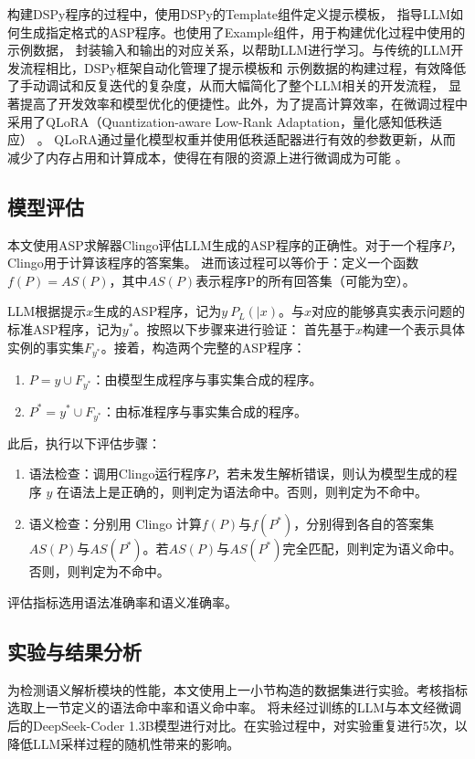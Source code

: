 构建DSPy程序的过程中，使用DSPy的Template组件定义提示模板，
指导LLM如何生成指定格式的ASP程序。也使用了Example组件，用于构建优化过程中使用的示例数据，
封装输入和输出的对应关系，以帮助LLM进行学习。与传统的LLM开发流程相比，DSPy框架自动化管理了提示模板和
示例数据的构建过程，有效降低了手动调试和反复迭代的复杂度，从而大幅简化了整个LLM相关的开发流程，
显著提高了开发效率和模型优化的便捷性。此外，为了提高计算效率，在微调过程中采用了QLoRA（Quantization-aware Low-Rank Adaptation，量化感知低秩适应） 。
QLoRA通过量化模型权重并使用低秩适配器进行有效的参数更新，从而减少了内存占用和计算成本，使得在有限的资源上进行微调成为可能 。
\subsection{模型评估}
本文使用ASP求解器Clingo评估LLM生成的ASP程序的正确性。对于一个程序$P$，Clingo用于计算该程序的答案集。
进而该过程可以等价于：定义一个函数$f(P) = AS(P)$，其中$AS(P)$表示程序P的所有回答集（可能为空）。

LLM根据提示$x$生成的ASP程序，记为$y ~ P_L(|x)$。与$x$对应的能够真实表示问题的标准ASP程序，记为$y^*$。按照以下步骤来进行验证：
首先基于$x$构建一个表示具体实例的事实集$F_{y^*}$。接着，构造两个完整的ASP程序：
\begin{enumerate}[itemsep=0pt,parsep=0pt]
\item $P = y \cup F_{y^*}$：由模型生成程序与事实集合成的程序。
\item $P^* = y^* \cup F_{y^*}$：由标准程序与事实集合成的程序。
\end{enumerate}

此后，执行以下评估步骤：
\begin{enumerate}
\item 语法检查：调用Clingo运行程序$P$，若未发生解析错误，则认为模型生成的程序 $y$ 在语法上是正确的，则判定为语法命中。否则，则判定为不命中。
\item 语义检查：分别用 Clingo 计算$f(P)$与$f(P^*)$，分别得到各自的答案集$AS(P)$与$AS(P^*)$。若$AS(P)$与$AS(P^*)$完全匹配，则判定为语义命中。
否则，则判定为不命中。
\end{enumerate}

评估指标选用语法准确率和语义准确率。
\subsection{实验与结果分析}
为检测语义解析模块的性能，本文使用上一小节构造的数据集进行实验。考核指标选取上一节定义的语法命中率和语义命中率。
将未经过训练的LLM与本文经微调后的DeepSeek-Coder 1.3B模型进行对比。在实验过程中，对实验重复进行5次，以
降低LLM采样过程的随机性带来的影响。

